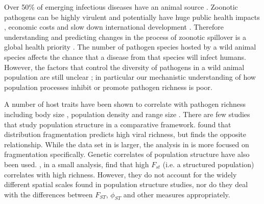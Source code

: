 

Over 50\% of emerging infectious diseases have an animal source \cite{jones2008global, smith2014global}.
Zoonotic pathogens can be highly virulent \cite{luby2009recurrent, lefebvre2014case} and potentially have huge public health impacts \cite{granich2015trends}, economic costs \cite{knobler2004learning} and slow down international development \cite{ebolaWorldbank}.
Therefore understanding and predicting changes in the process of zoonotic spillover is a global health priority \cite{taylor2001risk}.
The number of pathogen species hosted by a wild animal species affects the chance that a disease from that species will infect humans.
However, the factors that control the diversity of pathogens in a wild animal population are still unclear \cite{metcalf2015five}; in particular our mechanistic understanding of how population processes inhibit or promote pathogen richness is poor.






A number of host traits have been shown to correlate with pathogen richness including body size \cite{kamiya2014determines, arneberg2002host}, population density \cite{nunn2003comparative, arneberg2002host} and range size \cite{bordes2011impact, kamiya2014determines}.
There are few studies that study population structure in a comparative framework.
\textcite{maganga2014bat} found that distribution fragmentation predicts high viral richness, but \textcite{gay2014parasite} finds the opposite relationship. 
While the data set in \textcite{gay2014parasite} is larger, the analysis in \cite{maganga2014bat} is more focused on fragmentation specifically.
Genetic correlates of population structure have also been used.
\textcite{turmelle2009correlates}, in a small analysis, find that high $F_{st}$ (i.e. a structured population) correlates with high richness.
However, they do not account for the widely different spatial scales found in population structure studies, nor do they deal with the differences between $F_{ST}$, $\phi_{ST}$ and other measures appropriately. 

